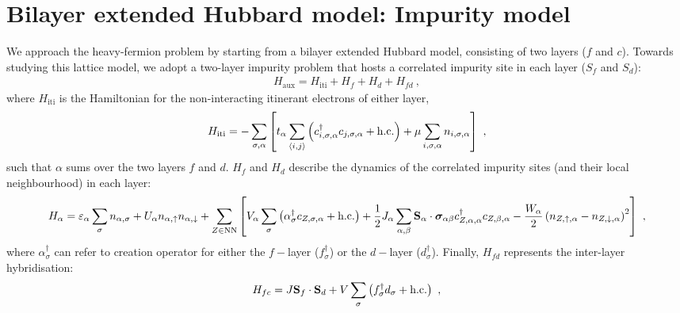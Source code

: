 \documentclass[%
reprint,
superscriptaddress,
groupedaddress,
superscriptaddress,
onecolumn,
10pt
]{revtex4-2}
\begin{document}
\section{Bilayer extended Hubbard model: Impurity model}
We approach the heavy-fermion problem by starting from a bilayer extended Hubbard model, consisting of two layers (\(f\) and \(c\)). Towards studying this lattice model, we adopt a two-layer impurity problem that hosts a correlated impurity site in each layer (\(S_f\) and \(S_d\)):
\begin{equation}\begin{aligned}
	H_\text{aux} = H_\text{iti} + H_f + H_d + H_{fd}~,
\end{aligned}\end{equation}
where \(H_\text{iti}\) is  the Hamiltonian for the non-interacting itinerant electrons of either layer,
\begin{equation}\begin{aligned}
H_\text{iti} = -\sum_{\sigma,\alpha}\left[t_\alpha\sum_{\braket{i,j}}\left(c^\dagger_{i,\sigma,\alpha}c_{j,\sigma,\alpha} + \text{h.c.}\right) + \mu\sum_{i,\sigma,\alpha}n_{i,\sigma,\alpha}\right] ~,
\end{aligned}\end{equation}
such that \(\alpha\) sums over the two layers \(f\) and \(d\). \(H_f\) and \(H_d\) describe the dynamics of the correlated impurity sites (and their local neighbourhood) in each layer:
\begin{equation}\begin{aligned}
	H_\alpha = \varepsilon_\alpha \sum_\sigma n_{\alpha,\sigma} + U_\alpha n_{\alpha,\uparrow} n_{\alpha,\downarrow} + \sum_{Z \in \text{NN}}\left[V_\alpha\sum_{\sigma}\left(\alpha^\dagger_{\sigma} c_{Z,\sigma,\alpha} + \text{h.c.}\right) + \frac{1}{2}J_\alpha\sum_{\alpha,\beta}{\bf S}_\alpha \cdot {\boldsymbol{\sigma}}_{\alpha\beta}c^\dagger_{Z,\alpha,\alpha}c_{Z,\beta,\alpha} - \frac{W_\alpha}{2} \left(n_{Z,\uparrow,\alpha} - n_{Z,\downarrow,\alpha}\right)^2\right] ~,\\
\end{aligned}\end{equation}
where \(\alpha^\dagger_{\sigma}\) can refer to creation operator for either the \(f-\)layer (\(f^\dagger_{\sigma}\)) or the \(d-\)layer (\(d^\dagger_{\sigma}\)). Finally, \(H_{fd}\) represents the inter-layer hybridisation:
\begin{equation}\begin{aligned}
	H_{fc} = J{\bf S}_f \cdot {\bf S}_d + V \sum_\sigma\left(f^\dagger_{\sigma} d_{\sigma} + \text{h.c.}\right)~,\\
\end{aligned}\end{equation}
\end{document}
